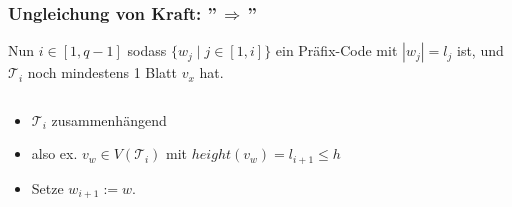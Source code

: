 \documentclass{beamer}
\begin{document}
\begin{frame}[t]
\begin{columns}
\begin{column}{0.5\textwidth}
{\begin{center}
            \end{center}
            }
    \end{column}
    \end{columns}
\end{frame}

\begin{frame}[t]
    \frametitle{Ungleichung von Kraft: ''$\,\Longrightarrow\,$''}
    Nun $i \in [1,q-1]$ sodass $\{w_j \mid j \in [1,i]\}$ ein Präfix-Code
    mit $|w_j| = l_j$ ist, und $\mathcal{T}_i$ noch mindestens 1 Blatt $v_x$ hat.\\[10pt]\pause

    \begin{columns}
    \begin{column}{0.77\textwidth}
        \begin{itemize}
            \item $\mathcal{T}_i$ zusammenhängend\\[10pt]
            \item also ex. $v_w \in V(\mathcal{T}_i)$ mit $height(v_w) = l_{i+1} \leq h$\\[10pt]
            \item Setze $w_{i+1} := w$.
        \end{itemize}
    \end{column}
    \begin{column}{0.23\textwidth}\onslide
        \begin{center}
        \end{center}
    \end{column}
    \end{columns}
\end{frame}
\end{document}
